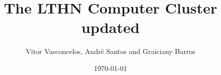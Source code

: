 \documentclass[notitlepage, 11pt]{report}
\title{The LTHN Computer Cluster updated}
\author{Vitor Vasconcelos, Andr\'e Santos and Graiciany Barros}
\date{\today}
\begin{document}
\maketitle
\thispagestyle{empty}

\begin{abstract}
  \normalsize

\end{abstract}
\end{document}
